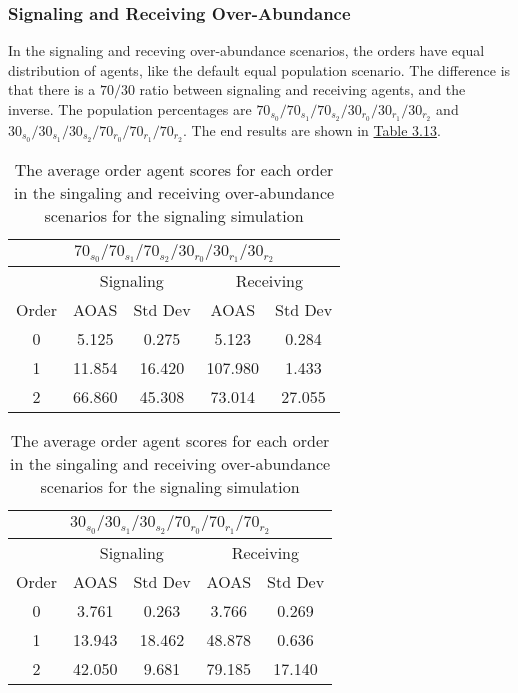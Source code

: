 \subsubsection{Signaling and Receiving Over-Abundance}

In the signaling and receving over-abundance scenarios, the orders have equal distribution of agents, like the default equal population scenario. The difference is that there is a $70/30$ ratio between signaling and receiving agents, and the inverse. The population percentages are $70_{s_{0}}/70_{s_{1}}/70_{s_{2}}/30_{r_{0}}/30_{r_{1}}/30_{r_{2}}$ and $30_{s_{0}}/30_{s_{1}}/30_{s_{2}}/70_{r_{0}}/70_{r_{1}}/70_{r_{2}}$. The end results are shown in \hyperref[table:sig-over-abundance]{Table 3.13}.


\begin{table}[h]
    \centering
    \begin{tabular}{|c|c|c|c|c|}
    \hline
    \multicolumn{5}{|c|}{$70_{s_{0}}/70_{s_{1}}/70_{s_{2}}/30_{r_{0}}/30_{r_{1}}/30_{r_{2}}$} \\
    \hline
    \multicolumn{1}{|c|}{} & \multicolumn{2}{|c|}{Signaling} & \multicolumn{2}{|c|}{Receiving} \\
    \hline
    Order & AOAS & Std Dev & AOAS & Std Dev \\
    \hline
    0     & 5.125     & 0.275    & 5.123      & 0.284   \\
    1     & 11.854    & 16.420   & 107.980    & 1.433   \\
    2     & 66.860    & 45.308   & 73.014     & 27.055   \\
    \hline
    \end{tabular}
    \qquad
    \begin{tabular}{|c|c|c|c|c|}
    \hline
    \multicolumn{5}{|c|}{$30_{s_{0}}/30_{s_{1}}/30_{s_{2}}/70_{r_{0}}/70_{r_{1}}/70_{r_{2}}$} \\
    \hline
    \multicolumn{1}{|c|}{} & \multicolumn{2}{|c|}{Signaling} & \multicolumn{2}{|c|}{Receiving} \\
    \hline
    Order & AOAS & Std Dev & AOAS & Std Dev \\
    \hline
    0     & 3.761   & 0.263    & 3.766   & 0.269   \\
    1     & 13.943  & 18.462   & 48.878  & 0.636   \\
    2     & 42.050  & 9.681    & 79.185  & 17.140   \\
    \hline
    \end{tabular}
    \caption{The average order agent scores for each order in the singaling and receiving over-abundance scenarios for the signaling simulation}
    \label{table:sig-over-abundance}
\end{table}

